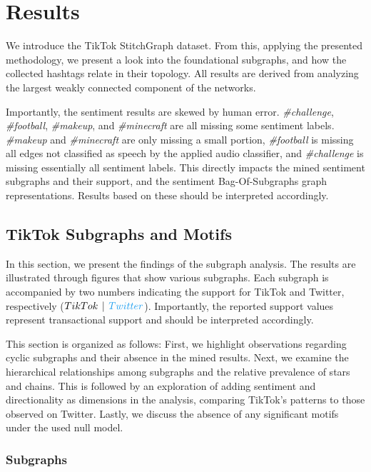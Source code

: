 \chapter{Results}
We introduce the TikTok StitchGraph dataset. From this, applying the presented methodology, we present a look into the foundational subgraphs, and how the collected hashtags relate in their topology. All results are derived from analyzing the largest weakly connected component of the networks.

Importantly, the sentiment results are skewed by human error. \textit{\#challenge}, \textit{\#football}, \textit{\#makeup}, and \textit{\#minecraft} are all missing some sentiment labels. \textit{\#makeup} and \textit{\#minecraft} are only missing a small portion, \textit{\#football} is missing all edges not classified as speech by the applied audio classifier, and \textit{\#challenge} is missing essentially all sentiment labels. This directly impacts the mined sentiment subgraphs and their support, and the sentiment Bag-Of-Subgraphs graph representations. Results based on these should be interpreted accordingly. 

\section{TikTok Subgraphs and Motifs}
In this section, we present the findings of the subgraph analysis. The results are illustrated through figures that show various subgraphs. Each subgraph is accompanied by two numbers indicating the support for TikTok and Twitter, respectively ($TikTok \hspace{4pt} | \hspace{4pt} \textcolor{TwitterBlue}{Twitter}$). Importantly, the reported support values represent transactional support and should be interpreted accordingly.

This section is organized as follows: First, we highlight observations regarding cyclic subgraphs and their absence in the mined results. Next, we examine the hierarchical relationships among subgraphs and the relative prevalence of stars and chains. This is followed by an exploration of adding sentiment and directionality as dimensions in the analysis, comparing TikTok’s patterns to those observed on Twitter. Lastly, we discuss the absence of any significant motifs under the used null model. 

\subsection{Subgraphs}

